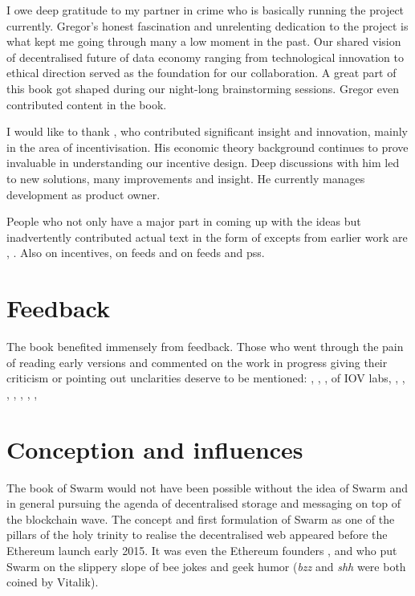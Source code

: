 I owe deep gratitude to my partner in crime  who is basically running the project currently. Gregor's honest fascination and unrelenting dedication to the project is what kept me going through many a low moment in the past. Our shared vision of decentralised future of data economy ranging from technological innovation to ethical direction served as the foundation for our collaboration. A great part of this book got shaped during our night-long brainstorming sessions. Gregor even contributed content in the book.

I would like to thank , who contributed significant insight and innovation, mainly in the area of incentivisation. His economic theory background continues to prove invaluable in understanding our incentive design. Deep discussions with him led to new solutions, many improvements and insight. He currently manages development as product owner.

People who not only have a major part in coming up with the ideas but inadvertently contributed actual text in the form of excepts from earlier work are , . Also  on incentives,  
 on feeds and  on feeds and pss. 

\section*{Feedback}

The book benefited immensely from feedback. Those who went through the pain of reading early versions and commented on the work in progress giving their criticism or pointing out unclarities deserve to be mentioned: , , ,  of IOV labs, 
, , 
, ,  , , , 



\section*{Conception and influences}

The book of Swarm would not have been possible without the idea of Swarm and in general pursuing the agenda of decentralised storage and messaging on top of the blockchain wave. The concept and first formulation of Swarm as one of the pillars of the holy trinity to realise the decentralised web appeared before the Ethereum launch early 2015. It was even the Ethereum founders ,  and  who put Swarm on the slippery slope of bee jokes and geek humor (\emph{bzz} and \emph{shh} were both coined by Vitalik). 

